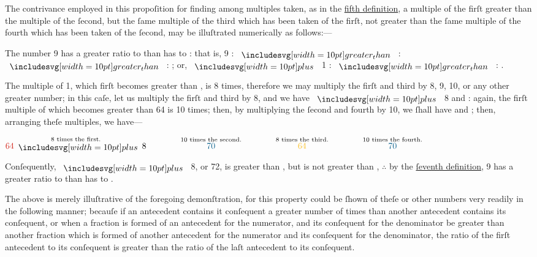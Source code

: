 \documentclass[11pt,preview]{standalone}
\begin{document}
\raggedright The contrivance employed in this propoſition for finding among multiples taken, as in the \hyperref[book5def5]{fifth definition}, a multiple of the firſt greater than the multiple of the ſecond, but the ſame multiple of the third which has been taken of the firſt, not greater than the ſame multiple of the fourth which has been taken of the ſecond, may be illuſtrated numerically as follows:---\\

\hfill

The number 9 has a greater ratio to {\color{cblue}{7}} than {\color{cyellow}{8}} has to {\color{cblue}{7}}: that is, 9 : {\color{cblue}{7}} $\bgt$ {\color{cyellow}{8}} : {\color{cblue}{7}} $\bgt$ {\color{cyellow}{8}} : {\color{cblue}{7}}; or, {\color{cred}{8}} $\bplus$ 1 : {\color{cblue}{7}} $\bgt$ {\color{cyellow}{8}} : {\color{cblue}{7}}.\\

\hfill

The multiple of 1, which firſt becomes greater than {\color{cblue}{7}}, is 8 times, therefore we may multiply the firſt and third by 8, 9, 10, or any other greater number; in this caſe, let us multiply the firſt and third by 8, and we have {\color{cred}{64}} $\bplus$ 8 and {\color{cyellow}{64}}: again, the firſt multiple of {\color{cblue}{7}} which becomes greater than 64 is 10 times; then, by multiplying the ſecond and fourth by 10, we ſhall have {\color{cblue}{70}} and {\color{cblue}{70}}; then, arranging theſe multiples, we have---\\

\begin{center}
    $\overset{\text{8 times the first.}}{{\color{cred}{64}} \bplus 8} \qquad\qquad \overset{\text{10 times the second.}}{{\color{cblue}{70}}} \qquad\qquad \overset{\text{8 times the third.}}{{\color{cyellow}{64}}} \qquad\qquad \overset{\text{10 times the fourth.}}{{\color{cblue}{70}}}$\\
\end{center}

Conſequently, {\color{cred}{64}} $\bplus$ 8, or 72, is greater than {\color{cblue}{70}}, but {\color{cyellow}{64}} is not greater than {\color{cblue}{70}}, $\therefore$ by the \hyperref[book5def7]{ſeventh definition}, 9 has a greater ratio to {\color{cblue}{7}} than {\color{cyellow}{8}} has to {\color{cblue}{7}}.\\

\hfill

The above is merely illuſtrative of the foregoing demonſtration, for this property could be ſhown of theſe or other numbers very readily in the following manner; becauſe if an antecedent contains it conſequent a greater number of times than another antecedent contains its conſequent, or when a fraction is formed of an antecedent for the numerator, and its conſequent for the denominator be greater than another fraction which is formed of another antecedent for the numerator and its conſequent for the denominator, the ratio of the firſt antecedent to its conſequent is greater than the ratio of the laſt antecedent to its conſequent.\\
\end{document}
